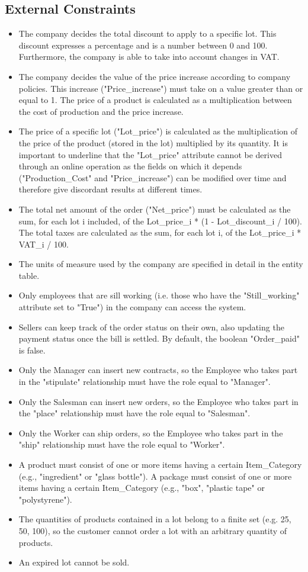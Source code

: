 \subsection{External Constraints}
\begin{itemize}
\item The company decides the total discount to apply to a specific lot. This discount expresses a percentage and is a number between 0 and 100. Furthermore, the company is able to take into account changes in VAT.
\item The company decides the value of the price increase according to company policies. This increase ("Price\_increase") must take on a value greater than or equal to 1. The price of a product is calculated as a multiplication between the cost of production and the price increase.
\item The price of a specific lot ("Lot\_price") is calculated as the multiplication of the price of the product (stored in the lot) multiplied by its quantity. It is important to underline that the "Lot\_price" attribute cannot be derived through an online operation as the fields on which it depends ("Production\_Cost" and "Price\_increase") can be modified over time and therefore give discordant results at different times.
\item The total net amount of the order ("Net\_price") must be calculated as the sum, for each lot i included, of the Lot\_price\_i * (1 - Lot\_discount\_i / 100). The total taxes are calculated as the sum, for each lot i, of the Lot\_price\_i * VAT\_i / 100.
\item The units of measure used by the company are specified in detail in the entity table.
\item Only employees that are sill working (i.e. those who have the "Still_working" attribute set to "True") in the company can access the system.
\item Sellers can keep track of the order status on their own, also updating the payment status once the bill is settled. By default, the boolean "Order\_paid" is false. 
\item Only the Manager can insert new contracts, so the Employee who takes part in the "stipulate" relationship must have the role equal to "Manager". 
\item Only the Salesman can insert new orders, so the Employee who takes part in the "place" relationship must have the role equal to "Salesman". 
\item Only the Worker can ship orders, so the Employee who takes part in the "ship" relationship must have the role equal to "Worker".
\item A product must consist of one or more items having a certain Item\_Category (e.g., "ingredient" or "glass bottle"). A package must consist of one or more items having a certain Item\_Category (e.g., "box", "plastic tape" or "polystyrene"). 
\item The quantities of products contained in a lot belong to a finite set (e.g. 25, 50, 100), so the customer cannot order a lot with an arbitrary quantity of products.
\item An expired lot cannot be sold.
\end{itemize}
